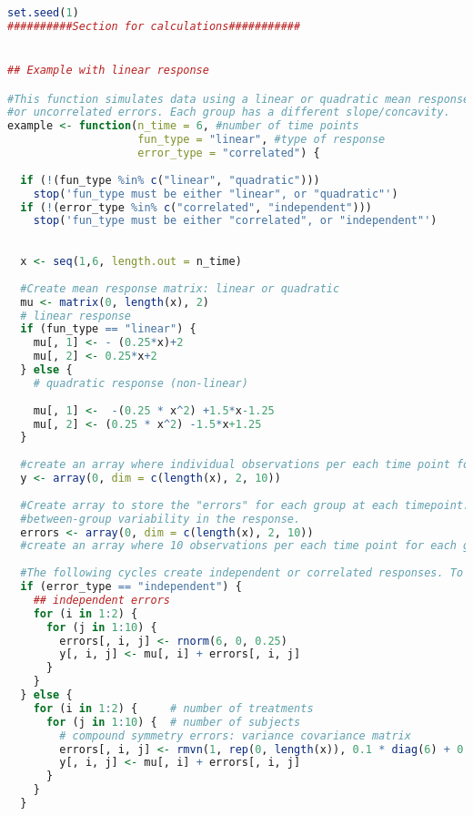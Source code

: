 \documentclass[
]{article}
\begin{document}
\begin{lstlisting}[language=R]
set.seed(1)
##########Section for calculations###########


## Example with linear response

#This function simulates data using a linear or quadratic mean response and each with correlated
#or uncorrelated errors. Each group has a different slope/concavity.
example <- function(n_time = 6, #number of time points
                    fun_type = "linear", #type of response
                    error_type = "correlated") {
  
  if (!(fun_type %in% c("linear", "quadratic")))
    stop('fun_type must be either "linear", or "quadratic"')
  if (!(error_type %in% c("correlated", "independent")))
    stop('fun_type must be either "correlated", or "independent"')
  
  
  x <- seq(1,6, length.out = n_time)
  
  #Create mean response matrix: linear or quadratic
  mu <- matrix(0, length(x), 2)
  # linear response
  if (fun_type == "linear") {
    mu[, 1] <- - (0.25*x)+2  
    mu[, 2] <- 0.25*x+2
  } else {
    # quadratic response (non-linear)
    
    mu[, 1] <-  -(0.25 * x^2) +1.5*x-1.25
    mu[, 2] <- (0.25 * x^2) -1.5*x+1.25
  }
  
  #create an array where individual observations per each time point for each group are to be stored. Currently using 10 observations per timepoint
  y <- array(0, dim = c(length(x), 2, 10))
  
  #Create array to store the "errors" for each group at each timepoint. The "errors" are the 
  #between-group variability in the response.
  errors <- array(0, dim = c(length(x), 2, 10))
  #create an array where 10 observations per each time point for each group are to be stored
  
  #The following cycles create independent or correlated responses. To each value of mu (mean response per group) a randomly generated error (correlated or uncorrelated) is added and thus the individual response is created.
  if (error_type == "independent") {
    ## independent errors
    for (i in 1:2) {
      for (j in 1:10) {
        errors[, i, j] <- rnorm(6, 0, 0.25)
        y[, i, j] <- mu[, i] + errors[, i, j]
      }
    }
  } else {
    for (i in 1:2) {     # number of treatments
      for (j in 1:10) {  # number of subjects
        # compound symmetry errors: variance covariance matrix
        errors[, i, j] <- rmvn(1, rep(0, length(x)), 0.1 * diag(6) + 0.25 * matrix(1, 6, 6))
        y[, i, j] <- mu[, i] + errors[, i, j]
      }
    }
  }    
  

\end{lstlisting}
\end{document}
